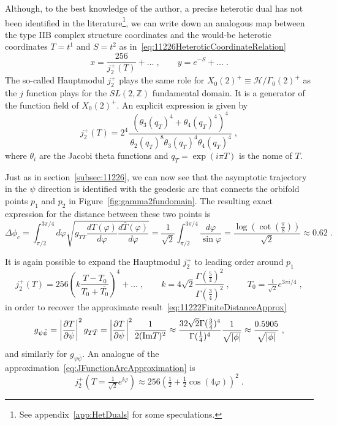 \documentclass[11pt,a4paper]{article}
\numberwithin{equation}{section}
\numberwithin{table}{section}\setlength{\multlinegap}{25pt}
\begin{document}
Although, to the best knowledge of the author, a precise heterotic dual has not been identified in the literature\footnote{See appendix~\ref{app:HetDuals} for some speculations.}, we can write down an analogous map between the type IIB complex structure coordinates and the would-be heterotic coordinates $T=t^1$ and $S=t^2$ as in~\eqref{eq:11226HeteroticCoordinateRelation}
\begin{equation}
    \label{eq:11222HeteroticCoordinateRelation}
    x=\frac{256}{j_2^+(T)}+\dots\;,\qquad y=e^{-S}+\dots\;.
\end{equation}
The so-called Hauptmodul $j_2^+$ plays the same role for $X_0(2)^+\equiv\mathcal{H}/\Gamma_0(2)^+$ as the $j$ function plays for the $SL(2,\mathbb{Z})$ fundamental domain. It is a generator of the function field of $X_0(2)^+$. An explicit expression is given by~\cite{Harnad:1998hh}
\begin{equation}
    j_2^+(T)=2^4
    \frac
    {\left(\theta_3(q_T)^4   +\theta_4(q_T)^4\right)^4}
    {\,\theta_2(q_T)^8\theta_3(q_T)^4\theta_4(q_T)^4}\;,
\end{equation}
where $\theta_i$ are the Jacobi theta functions and $q_T=\exp(i\pi T)$ is the nome of $T$.

Just as in section~\ref{subsec:11226}, we can now see that the asymptotic trajectory in the $\psi$ direction is identified with the geodesic arc that connects the orbifold points $p_1$ and $p_2$ in Figure~\ref{fig:gamma2fundomain}. The resulting exact expression for the distance between these two points is
\begin{equation}
    \label{eq:11222DeltaPhiExact}
    \Delta\phi_c=\int_{\pi/2}^{3\pi/4}d\varphi \sqrt{g_{T\bar{T}}\frac{d T(\varphi)}{d\varphi}\frac{d \bar{T}(\varphi)}{d\varphi}}=\frac{1}{\sqrt{2}}\int_{\pi/2}^{3\pi/4} \frac{d\varphi}{\sin\varphi}=\frac{\log(\cot(\tfrac{\pi}{8}))}{\sqrt{2}}\approx 0.62\;.
\end{equation}

It is again possible to expand the Hauptmodul $j_2^+$ to leading order around $p_1$\cite{BayerTravesa:2007}
\begin{equation}
    \label{eq:J2PlusExpansionLeadingOrder}
    j_2^+(T)=256\left(k\frac{T-T_0}{T_0+\overline{T_0}}\right)^4+\dots\;,\qquad k=4\sqrt{2}\frac{\Gamma(\tfrac54)^2}{\Gamma(\tfrac34)^2}\;, \qquad T_0=\tfrac{1}{\sqrt{2}}e^{3\pi i/4}\;,
\end{equation}
in order to recover the approximate result~\eqref{eq:11222FiniteDistanceApprox}
\begin{equation}
    g_{\psi\bar{\psi}}=\left|\frac{\partial T}{\partial\psi}\right|^2g_{T\bar{T}}=\left|\frac{\partial T}{\partial\psi}\right|^2\frac{1}{2(\textup{Im}T)^2}\approx\frac{32\sqrt{2}\Gamma(\tfrac34)^4}{\Gamma(\tfrac14)^4}\frac{1}{\sqrt{|\phi|}}\approx \frac{0.5905}{\sqrt{|\phi|}}\;,
\end{equation}
and similarly for $g_{\psi\bar{\psi}}$. An analogue of the approximation~\eqref{eq:JFunctionArcApproximation} is
\begin{equation}
    j_2^+(T=\tfrac{1}{\sqrt{2}}e^{i\varphi})\approx 256\left(\tfrac12+\tfrac12\cos(4\varphi)\right)^2\;.
\end{equation}
\end{document}
